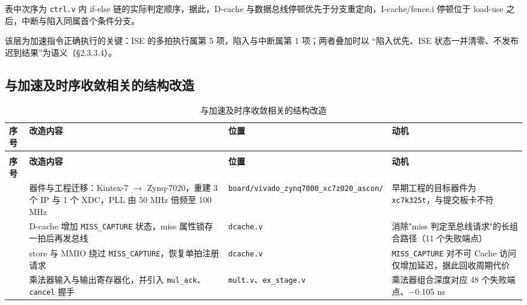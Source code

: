 表中次序为 \texttt{ctrl.\allowbreak{}v} 内 if-else 链的实际判定顺序，据此，D-cache 与数据总线停顿优先于分支重定向，I-cache/fence.i 停顿位于 load-use 之后，中断与陷入同属首个条件分支。

该层为加速指令正确执行的关键：ISE 的多拍执行属第 5 项，陷入与中断属第 1 项；两者叠加时以 ``陷入优先、ISE 状态一并清零、不发布迟到结果''为语义（§2.3.3.4）。

\Needspace{150pt}

\subsection{与加速及时序收敛相关的结构改造}

{\small
\setlength{\tabcolsep}{4pt}
\renewcommand{\thetable}{2-5}
\begin{longtable}{@{}>{\raggedright\arraybackslash}p{}>{\raggedright\arraybackslash}p{}>{\raggedright\arraybackslash}p{}>{\raggedright\arraybackslash}p{}@{}}
\caption{与加速及时序收敛相关的结构改造}\label{tab:2-5}\\
\toprule
\textbf{序号} & \textbf{改造内容} & \textbf{位置} & \textbf{动机} \\
\midrule
\endfirsthead
\multicolumn{4}{@{}l}{\footnotesize 续表 2-5}\\
\toprule
\textbf{序号} & \textbf{改造内容} & \textbf{位置} & \textbf{动机} \\
\midrule
\endhead
1 & 器件与工程迁移：Kintex-7 $\rightarrow$ Zynq-7020，重建 3 个 IP 与 1 个 XDC，PLL 由 50 MHz 倍频至 100 MHz & \texttt{board/\allowbreak{}vivado\_\allowbreak{}\allowbreak{}zynq7000\_\allowbreak{}\allowbreak{}xc7z020\_\allowbreak{}\allowbreak{}ascon/\allowbreak{}} & 早期工程的目标器件为 \texttt{xc7k325t}，与提交板卡不符 \\
2 & D-cache 增加 \texttt{MISS\_\allowbreak{}\allowbreak{}CAPTURE} 状态，miss 属性锁存一拍后再发总线 & \texttt{dcache.\allowbreak{}v} & 消除"miss 判定至总线请求"的长组合路径（11 个失败端点） \\
3 & store 与 MMIO 绕过 \texttt{MISS\_\allowbreak{}\allowbreak{}CAPTURE}，恢复单拍注册请求 & \texttt{dcache.\allowbreak{}v} & \texttt{MISS\_\allowbreak{}\allowbreak{}CAPTURE} 对不可 Cache 访问仅增加延迟，据此回收周期代价 \\
4 & 乘法器输入与输出寄存器化，并引入 \texttt{mul\_\allowbreak{}\allowbreak{}ack}、\texttt{cancel} 握手 & \texttt{mult.\allowbreak{}v}、\texttt{ex\_\allowbreak{}\allowbreak{}stage.\allowbreak{}v} & 乘法器组合深度对应 48 个失败端点、$-$0.105 ns \\

\end{longtable}}
